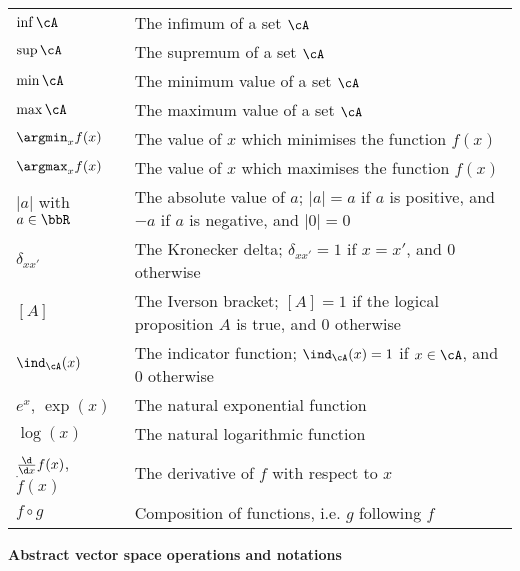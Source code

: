 \begin{longtable}{p{}p{}}
  $\inf \cA$ & The infimum of a set $\cA$ \\  
  $\sup \cA$ & The supremum of a set $\cA$ \\  
  $\min \cA$ & The minimum value of a set $\cA$ \\   
  $\max \cA$ & The maximum value of a set $\cA$ \\   
  $\argmin_x f(x)$ & The value of $x$ which minimises the function $f(x)$ \\  
  $\argmax_x f(x)$ & The value of $x$ which maximises the function $f(x)$ \\              
  $\vert a \vert$ with $a\in\bbR$ & The absolute value of $a$; $\vert a \vert = a$ if $a$ is positive, and $-a$ if $a$ is negative, and $\vert 0 \vert = 0$ \\  
  $\delta_{xx'}$ & The Kronecker delta; $\delta_{xx'} = 1$ if $x = x'$, and 0 otherwise \\
  $[A]$ & The Iverson bracket; $[A] = 1$ if the logical proposition $A$ is true, and 0 otherwise \\
  $\ind_\cA(x)$ & The indicator function; $\ind_\cA(x) = 1$ if $x \in \cA$, and 0 otherwise \\  
  $e^x$, $\exp(x)$ & The natural exponential function \\
  $\log(x)$ & The natural logarithmic function \\
  $\frac{\d}{\d x} f(x)$, $\dot f(x)$ & The derivative of $f$ with respect to $x$ \\  
  $f \circ g$ & Composition of functions, i.e. $g$ following $f$ \\ 
\end{longtable}

\noindent\textbf{Abstract vector space operations and notations}

